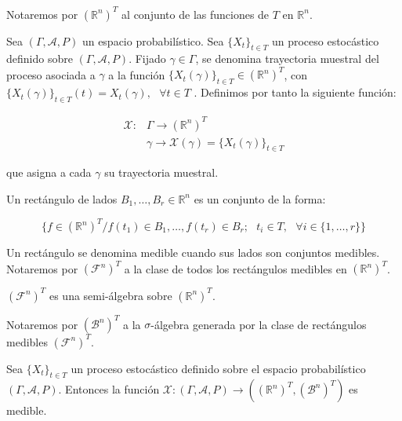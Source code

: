 \iffalse
\begin{notacion}
Notaremos por $(\mathds{R}^n)^T$ al conjunto de las funciones de $T$ en $\mathds{R}^n$.
\end{notacion}

\begin{definicion}
Sea $(\Gamma, \mathcal{A}, P)$ un espacio probabilístico. Sea $\{X_t\}_{t\in T}$ un proceso estocástico definido sobre $(\Gamma, \mathcal{A}, P)$. Fijado $\gamma \in \Gamma$, se denomina trayectoria muestral del proceso asociada a $\gamma$ a la función $\{X_t(\gamma)\}_{t\in T} \in (\mathds{R}^n)^T$, con $\{X_t(\gamma)\}_{t\in T}(t) = X_t(\gamma),\text{ }\forall t\in T$ . Definimos por tanto la siguiente función:

\begin{align*}
\mathcal{X}: &\Gamma \rightarrow (\mathds{R}^n)^T \\
&\gamma \rightarrow \mathcal{X}(\gamma) = \{X_t(\gamma)\}_{t\in T} 
\end{align*}

que asigna a cada $\gamma$ su trayectoria muestral.
\end{definicion}

\begin{definicion}
Un rectángulo de lados $B_1,\ldots , B_r \in \mathds{R}^n$ es un conjunto de la forma:

$$\{f\in (\mathds{R}^n)^T / f(t_1)\in B_1, \ldots , f(t_r)\in B_r;\text{ } t_i\in T,\text{ } \forall i \in \{1,\ldots ,r\}\}$$

Un rectángulo se denomina medible cuando sus lados son conjuntos medibles. Notaremos por $(\mathscr{F}^n)^T$ a la clase de todos los rectángulos medibles en $(\mathds{R}^n)^T$.
\end{definicion}

\begin{proposicion}
$(\mathscr{F}^n)^T$ es una semi-álgebra sobre $(\mathds{R}^n)^T$.
\end{proposicion}

\begin{notacion}
Notaremos por $(\mathscr{B}^n)^T$ a la $\sigma$-álgebra generada por la clase de rectángulos medibles $(\mathscr{F}^n)^T$.
\end{notacion}

\begin{teorema}
Sea $\{X_t\}_{t\in T}$ un proceso estocástico definido sobre el espacio probabilístico $(\Gamma , \mathcal{A}, P)$. Entonces la función $\mathcal{X}: (\Gamma , \mathcal{A}, P)\rightarrow ((\mathds{R}^n)^T,(\mathscr{B}^n)^T)$ es medible.
\end{teorema}

